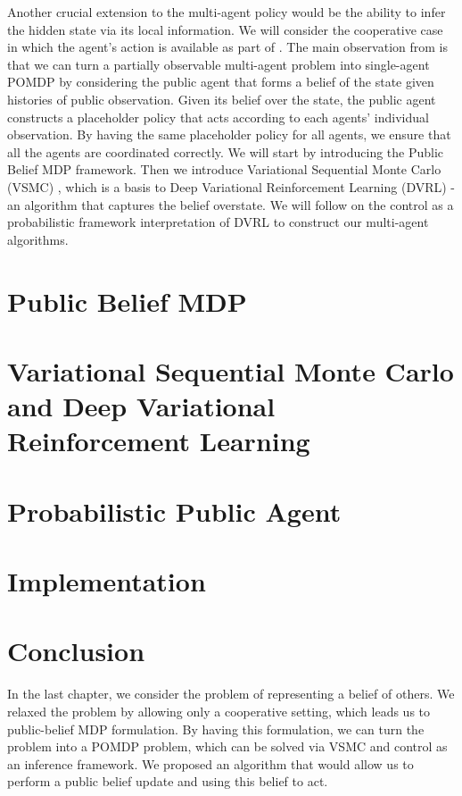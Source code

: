 \label{chapter:chap5}
\begin{miniabstract}
Another crucial extension to the multi-agent policy would be the ability to infer the hidden state via its local information. We will consider the cooperative case in which the agent's action is available as part of . The main observation from \cite{nayyar2013decentralized, foerster2018bayesian} is that we can turn a partially observable multi-agent problem into single-agent POMDP by considering the public agent that forms a belief of the state given histories of public observation. Given its belief over the state, the public agent constructs a placeholder policy that acts according to each agents' individual observation. By having the same placeholder policy for all agents, we ensure that all the agents are coordinated correctly. We will start by introducing the Public Belief MDP framework. Then we introduce Variational Sequential Monte Carlo (VSMC) \cite{le2017auto, maddison2017filtering, naesseth2017variational}, which is a basis to Deep Variational Reinforcement Learning (DVRL) \cite{igl2018deep} - an algorithm that captures the belief overstate. We will follow \cite{shvechikovjoint} on the control as a probabilistic framework interpretation of DVRL to construct our multi-agent algorithms.
\end{miniabstract}

\section{Public Belief MDP}


\section{Variational Sequential Monte Carlo and Deep Variational Reinforcement Learning}


\section{Probabilistic Public Agent}


\section{Implementation}


\section{Conclusion}
In the last chapter, we consider the problem of representing a belief of others. We relaxed the problem by allowing only a cooperative setting, which leads us to public-belief MDP formulation. By having this formulation, we can turn the problem into a POMDP problem, which can be solved via VSMC and control as an inference framework. We proposed an algorithm that would allow us to perform a public belief update and using this belief to act.
